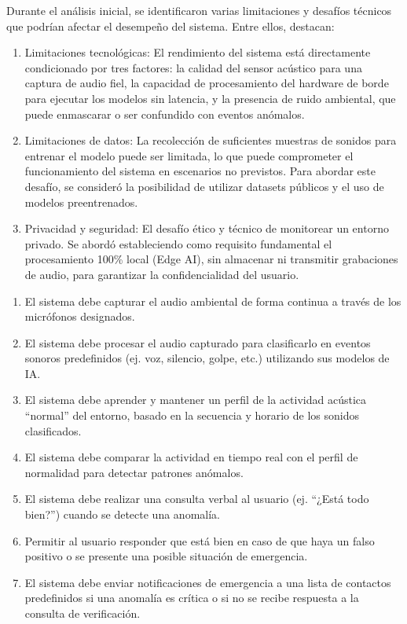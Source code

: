 
Durante el análisis inicial, se identificaron varias limitaciones y desafíos técnicos que podrían afectar el desempeño del sistema. Entre ellos, destacan:

\begin{enumerate}
      \item Limitaciones tecnológicas: El rendimiento del sistema está directamente condicionado por tres factores: la calidad del sensor acústico para una captura de audio fiel, la capacidad de procesamiento del hardware de borde para ejecutar los modelos sin latencia, y la presencia de ruido ambiental, que puede enmascarar o ser confundido con eventos anómalos.
      \item Limitaciones de datos: La recolección de suficientes muestras de sonidos para entrenar el modelo puede ser limitada, lo que puede comprometer el funcionamiento del sistema en escenarios no previstos. Para abordar este desafío, se consideró la posibilidad de utilizar datasets públicos y el uso de modelos preentrenados.
      \item Privacidad y seguridad: El desafío ético y técnico de monitorear un entorno privado. Se abordó estableciendo como requisito fundamental el procesamiento 100\% local (Edge AI), sin almacenar ni transmitir grabaciones de audio, para garantizar la confidencialidad del usuario.
\end{enumerate}


\begin{enumerate}
      \item El sistema debe capturar el audio ambiental de forma continua a través de los micrófonos designados.
      \item El sistema debe procesar el audio capturado para clasificarlo en eventos sonoros predefinidos (ej. voz, silencio, golpe, etc.) utilizando sus modelos de IA.
      \item El sistema debe aprender y mantener un perfil de la actividad acústica ``normal'' del entorno, basado en la secuencia y horario de los sonidos clasificados.
      \item El sistema debe comparar la actividad en tiempo real con el perfil de normalidad para detectar patrones anómalos.
      \item El sistema debe realizar una consulta verbal al usuario (ej. ``¿Está todo bien?'') cuando se detecte una anomalía.
      \item Permitir al usuario responder que está bien en caso de que haya un falso positivo o se presente una posible situación de emergencia.
      \item El sistema debe enviar notificaciones de emergencia a una lista de contactos predefinidos si una anomalía es crítica o si no se recibe respuesta a la consulta de verificación.
\end{enumerate}

